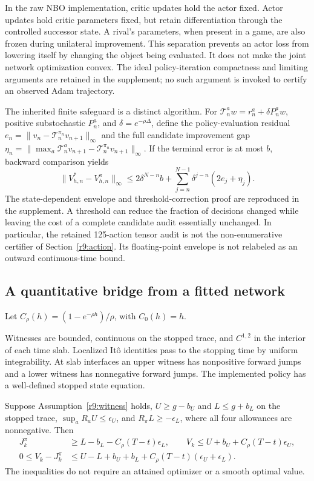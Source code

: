 In the raw NBO implementation, critic updates hold the actor fixed. Actor updates hold critic parameters fixed, but retain differentiation through the controlled successor state. A rival's parameters, when present in a game, are also frozen during unilateral improvement. This separation prevents an actor loss from lowering itself by changing the object being evaluated. It does not make the joint network optimization convex. The ideal policy-iteration compactness and limiting arguments are retained in the supplement; no such argument is invoked to certify an observed Adam trajectory.

The inherited finite safeguard is a distinct algorithm. For $\mathcal T_n^aw=r_n^a+\delta P_n^aw$, positive substochastic $P_n^a$, and $\delta=e^{-\rho\Delta}$, define the policy-evaluation residual $e_n=\|v_n-\mathcal T_n^{\pi_n}v_{n+1}\|_\infty$ and the full candidate improvement gap $\eta_n=\|\max_a\mathcal T_n^av_{n+1}-\mathcal T_n^{\pi_n}v_{n+1}\|_\infty$. If the terminal error is at most $b$, backward comparison yields
\begin{equation}
 \|V_{h,n}^*-V_{h,n}^{\pi}\|_\infty
 \leq2\delta^{N-n}b+\sum_{j=n}^{N-1}\delta^{j-n}(2e_j+\eta_j).\label{r9:finite}
\end{equation}
The state-dependent envelope and threshold-correction proof are reproduced in the supplement. A threshold can reduce the fraction of decisions changed while leaving the cost of a complete candidate audit essentially unchanged. In particular, the retained 125-action tensor audit is not the non-enumerative certifier of Section~\ref{r9:action}. Its floating-point envelope is not relabeled as an outward continuous-time bound.

\subsection{A quantitative bridge from a fitted network}
Let $C_\rho(h)=(1-e^{-\rho h})/\rho$, with $C_0(h)=h$.
\begin{assumption}\label{r9:witness}
Witnesses are bounded, continuous on the stopped trace, and $C^{1,2}$ in the interior of each time slab. Localized It\^o identities pass to the stopping time by uniform integrability. At slab interfaces an upper witness has nonpositive forward jumps and a lower witness has nonnegative forward jumps. The implemented policy has a well-defined stopped state equation.
\end{assumption}
\begin{theorem}\label{r9:pair}
Suppose Assumption~\ref{r9:witness} holds, $U\geq g-b_U$ and $L\leq g+b_L$ on the stopped trace, $\sup_aR_aU\leq\epsilon_U$, and $R_\pi L\geq-\epsilon_L$, where all four allowances are nonnegative. Then
\begin{align}
 J_k^\pi&\geq L-b_L-C_\rho(T-t)\epsilon_L,\qquad
 V_k\leq U+b_U+C_\rho(T-t)\epsilon_U,\\
 0\leq V_k-J_k^\pi&\leq U-L+b_U+b_L+C_\rho(T-t)(\epsilon_U+\epsilon_L).\label{r9:pairbound}
\end{align}
The inequalities do not require an attained optimizer or a smooth optimal value.
\end{theorem}

